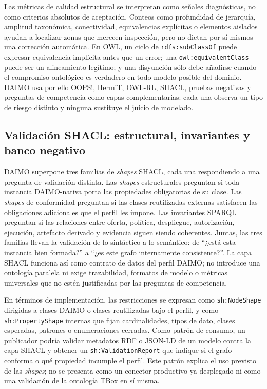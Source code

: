 \documentclass[Afour,sagev,times]{sagej}
\newcommand{\code}[1]{\texttt{#1}}
\begin{document}
Las métricas de calidad estructural se interpretan como señales diagnósticas, no como criterios absolutos de aceptación. Conteos como profundidad de jerarquía, amplitud taxonómica, conectividad, equivalencias explícitas o elementos aislados ayudan a localizar zonas que merecen inspección, pero no dictan por sí mismos una corrección automática. En OWL, un ciclo de \code{rdfs:subClassOf} puede expresar equivalencia implícita antes que un error; una \code{owl:equivalentClass} puede ser un alineamiento legítimo; y una disyunción sólo debe añadirse cuando el compromiso ontológico es verdadero en todo modelo posible del dominio. DAIMO usa por ello OOPS!, HermiT, OWL-RL, SHACL, pruebas negativas y preguntas de competencia como capas complementarias: cada una observa un tipo de riesgo distinto y ninguna sustituye el juicio de modelado.

\subsection{Validación SHACL: estructural, invariantes y banco negativo}\label{sec:eval-invariants}

DAIMO superpone tres familias de \emph{shapes} SHACL, cada una respondiendo a una pregunta de validación distinta. Las \emph{shapes} estructurales preguntan si toda instancia DAIMO-nativa porta las propiedades obligatorias de su clase. Las \emph{shapes} de conformidad preguntan si las clases reutilizadas externas satisfacen las obligaciones adicionales que el perfil les impone. Las invariantes SPARQL preguntan si las relaciones entre oferta, política, despliegue, autorización, ejecución, artefacto derivado y evidencia siguen siendo coherentes. Juntas, las tres familias llevan la validación de lo sintáctico a lo semántico: de ``¿está esta instancia bien formada?'' a ``¿es este grafo internamente consistente?''. La capa SHACL funciona así como contrato de datos del perfil DAIMO; no introduce una ontología paralela ni exige trazabilidad, formatos de modelo o métricas universales que no estén justificadas por las preguntas de competencia.

En términos de implementación, las restricciones se expresan como \code{sh:NodeShape} dirigidas a clases DAIMO o clases reutilizadas bajo el perfil, y como \code{sh:PropertyShape} internas que fijan cardinalidades, tipos de dato, clases esperadas, patrones o enumeraciones cerradas. Como patrón de consumo, un publicador podría validar metadatos RDF o JSON-LD de un modelo contra la capa SHACL y obtener un \code{sh:ValidationReport} que indique si el grafo conforma o qué propiedad incumple el perfil. Este patrón explica el uso previsto de las \emph{shapes}; no se presenta como un conector productivo ya desplegado ni como una validación de la ontología TBox en sí misma.
\end{document}
